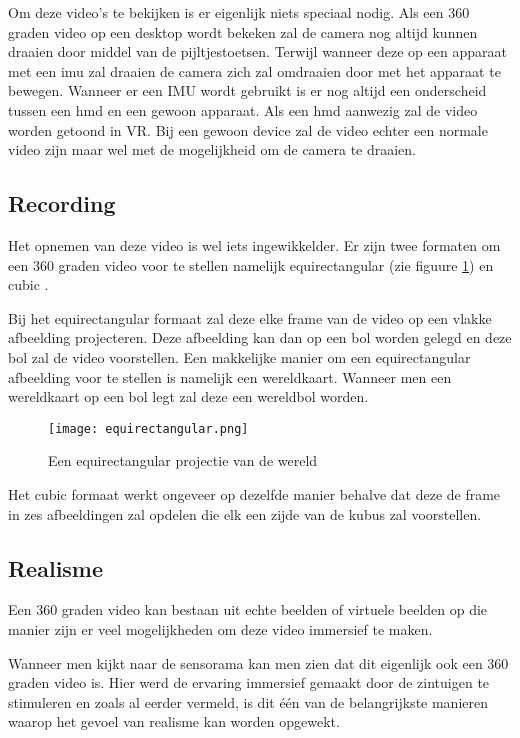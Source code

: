 Om deze video's te bekijken is er eigenlijk niets speciaal nodig. Als een 360 graden video op een desktop wordt bekeken zal de camera nog altijd kunnen draaien door middel van de pijltjestoetsen. Terwijl wanneer deze op een apparaat met een \acrshort{imu} zal draaien de camera zich zal omdraaien door met het apparaat te bewegen. Wanneer er een IMU wordt gebruikt is er nog altijd een onderscheid tussen een \acrshort{hmd} en een gewoon apparaat. Als een \acrshort{hmd} aanwezig zal de video worden getoond in VR. Bij een gewoon device zal de video echter een normale video zijn maar wel met de mogelijkheid om de camera te draaien.

\subsection{Recording}
Het opnemen van deze video is wel iets ingewikkelder. Er zijn twee formaten om een 360 graden video voor te stellen namelijk equirectangular (zie figuure \ref{fig:equirectangularprojection}) en cubic \autocite{Lee2010}. 

Bij het equirectangular formaat zal deze elke frame van de video op een vlakke afbeelding projecteren. Deze afbeelding kan dan op een bol worden gelegd en deze bol zal de video voorstellen. Een makkelijke manier om een equirectangular afbeelding voor te stellen is namelijk een wereldkaart. Wanneer men een wereldkaart op een bol legt zal deze een wereldbol worden.
 
\begin{figure}
    \texttt{[image: equirectangular.png]}
    \caption{Een equirectangular projectie van de wereld}
    \label{fig:equirectangularprojection}
\end{figure}

Het cubic formaat werkt ongeveer op dezelfde manier behalve dat deze de frame in zes afbeeldingen zal opdelen die elk een zijde van de kubus zal voorstellen.

\subsection{Realisme}
Een 360 graden video kan bestaan uit echte beelden of virtuele beelden op die manier zijn er veel mogelijkheden om deze video immersief te maken. 

Wanneer men kijkt naar de sensorama kan men zien dat dit eigenlijk ook een 360 graden video is. Hier werd de ervaring immersief gemaakt door de zintuigen te stimuleren en zoals al eerder vermeld, is dit één van de belangrijkste manieren waarop het gevoel van realisme kan worden opgewekt.

